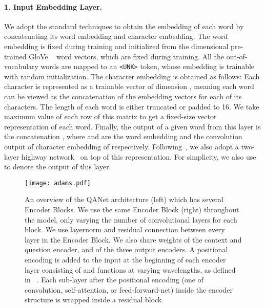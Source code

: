\documentclass{article} \usepackage{iclr2018_conference,times}
\begin{document}
\paragraph{1. Input Embedding Layer.} We adopt the standard techniques to obtain the embedding of each word  by concatenating its word embedding and character embedding. The word embedding is fixed during training and initialized from the  dimensional pre-trained GloVe ~\citep{pennington2014glove} word vectors, which are fixed during training. All the out-of-vocabulary words are mapped to an \texttt{<UNK>} token, whose embedding is trainable with random initialization. The character embedding is obtained as follows:
Each character is represented as a trainable vector of dimension , meaning each word can be viewed as the concatenation of the embedding vectors for each of its characters. The length of each word is either truncated or padded to 16. We take maximum value of each row of this matrix to get a fixed-size vector representation of each word. Finally, the output of a given word  from this layer is the concatenation , where  and  are the word embedding and the convolution output of character embedding of  respectively.
Following~\cite{SeoKFH16}, we also adopt a two-layer highway network~\citep{SrivastavaGS15} on top of this representation.
For simplicity, we also use  to denote the output of this layer.  
\begin{figure}[t]
 \centering \texttt{[image: adams.pdf]}
\caption{An overview of the QANet architecture (left) which has several Encoder Blocks. We use the same Encoder Block (right) throughout the model, only varying the number of convolutional layers for each block. We use layernorm and residual connection between every layer in the Encoder Block. We also share weights of the context and question encoder, and of the three output encoders.  A positional encoding is added to the input at the beginning of each encoder layer consisting of  and  functions at varying wavelengths, as defined in ~\citep{VaswaniSPUJGKP17}.
 Each sub-layer after the positional encoding (one of convolution, self-attention, or feed-forward-net) inside the encoder structure is wrapped inside a residual block.}
\label{model_diagram}
\end{figure}
\end{document}
